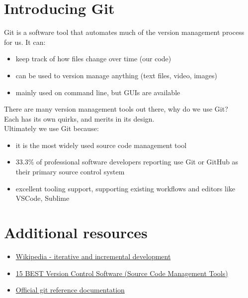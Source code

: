 \section{Introducing Git}

Git is a software tool that automates much of the version management process for us. It can:

\begin{itemize}
    \item keep track of how files change over time (our code)
    \item can be used to version manage anything (text files, video, images)
    \item mainly used on command line, but GUIs are available
\end{itemize}

There are many version management tools out there, why do we use Git?
\\

Each has its own quirks, and merits in its design.
\\

Ultimately we use Git because:

\begin{itemize}
    \item it is the most widely used source code management tool
	\item 33.3\% of professional software developers reporting use Git or GitHub as their primary source control system
	\item excellent tooling support, supporting existing workflows and editors like VSCode, Sublime
\end{itemize}


\section{Additional resources}

\begin{itemize}[leftmargin=*]
    \item \href{https://en.wikipedia.org/wiki/Iterative_and_incremental_development}{Wikipedia - iterative and incremental development }
    \item \href{https://www.softwaretestinghelp.com/version-control-software/}{15 BEST Version Control Software (Source Code Management Tools) }
	\item \href{https://git-scm.com/doc}{Official git reference documentation}
\end{itemize}